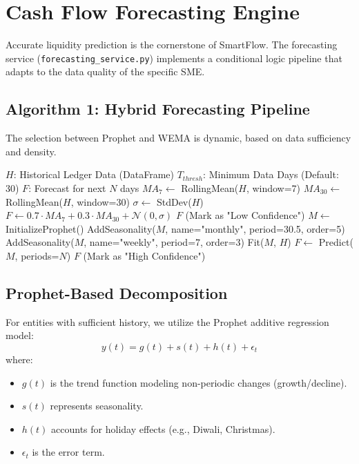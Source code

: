 \documentclass[conference]{IEEEtran}
\begin{document}
\section{Cash Flow Forecasting Engine}

Accurate liquidity prediction is the cornerstone of SmartFlow. The forecasting service (\texttt{forecasting\_service.py}) implements a conditional logic pipeline that adapts to the data quality of the specific SME.

\subsection{Algorithm 1: Hybrid Forecasting Pipeline}
The selection between Prophet and WEMA is dynamic, based on data sufficiency and density.

\begin{algorithm}
\caption{Hybrid Cash Flow Forecasting}
\begin{algorithmic}[1]
\REQUIRE $H$: Historical Ledger Data (DataFrame)
\REQUIRE $T_{thresh}$: Minimum Data Days (Default: 30)
\ENSURE $F$: Forecast for next $N$ days
    \STATE $MA_7 \leftarrow$ RollingMean($H$, window=7)
    \STATE $MA_{30} \leftarrow$ RollingMean($H$, window=30)
    \STATE $\sigma \leftarrow$ StdDev($H$)
    \STATE $F \leftarrow 0.7 \cdot MA_7 + 0.3 \cdot MA_{30} + \mathcal{N}(0, \sigma)$
    \RETURN $F$ (Mark as "Low Confidence")
\ELSE
    \STATE $M \leftarrow$ InitializeProphet()
    \STATE AddSeasonality($M$, name="monthly", period=30.5, order=5)
    \STATE AddSeasonality($M$, name="weekly", period=7, order=3)
    \STATE Fit($M$, $H$)
    \STATE $F \leftarrow$ Predict($M$, periods=$N$)
    \RETURN $F$ (Mark as "High Confidence")
\ENDIF
\end{algorithmic}
\label{alg:forecasting}
\end{algorithm}

\subsection{Prophet-Based Decomposition}
For entities with sufficient history, we utilize the Prophet additive regression model:
\begin{equation}
y(t) = g(t) + s(t) + h(t) + \epsilon_t
\end{equation}
where:
\begin{itemize}
    \item $g(t)$ is the trend function modeling non-periodic changes (growth/decline).
    \item $s(t)$ represents seasonality.
    \item $h(t)$ accounts for holiday effects (e.g., Diwali, Christmas).
    \item $\epsilon_t$ is the error term.
\end{itemize}
\end{document}
